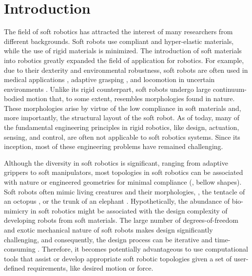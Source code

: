 \section{Introduction}
The field of soft robotics has attracted the interest of many researchers from different backgrounds. Soft robots use compliant and hyper-elastic materials, while the use of rigid materials is minimized. The introduction of soft materials into robotics greatly expanded the field of application for robotics. For example, due to their dexterity and environmental robustness, soft robots are often used in medical applications \cite{Polygerinos2015, Yap2015, Asbeck2015Nov}, adaptive grasping \cite{Galloway2016,Hughes2016Nov}, and locomotion in uncertain environments \cite{Drotman2017}. Unlike its rigid counterpart, soft robots undergo large continuum-bodied motion that, to some extent, resembles morphologies found in nature. These morphologies arise by virtue of the low compliance in soft materials and, more importantly, the structural layout of the soft robot. As of today, many of the fundamental engineering principles in rigid robotics, like design, actuation, sensing, and control, are often not applicable to soft robotics systems. Since its inception, most of these engineering problems have remained challenging.

Although the diversity in soft robotics is significant, ranging from adaptive grippers to soft manipulators, most topologies in soft robotics can be associated with nature or engineered geometries for minimal compliance (\eg, bellow shapes). Soft robots often mimic living creatures and their morphologies, \eg, the tentacle of an octopus \cite{Galloway2016, Wehner2016}, or the trunk of an elephant \cite{Drotman2017}. Hypothetically, the abundance of bio-mimicry in soft robotics might be associated with the design complexity of developing robots from soft materials. The large number of degrees-of-freedom and exotic mechanical nature of soft robots makes design significantly challenging, and consequently, the design process can be iterative and time-consuming \cite{Wehner2016}. Therefore, it becomes potentially advantageous to use computational tools that assist or develop appropriate soft robotic topologies given a set of user-defined requirements, like desired motion or force.

